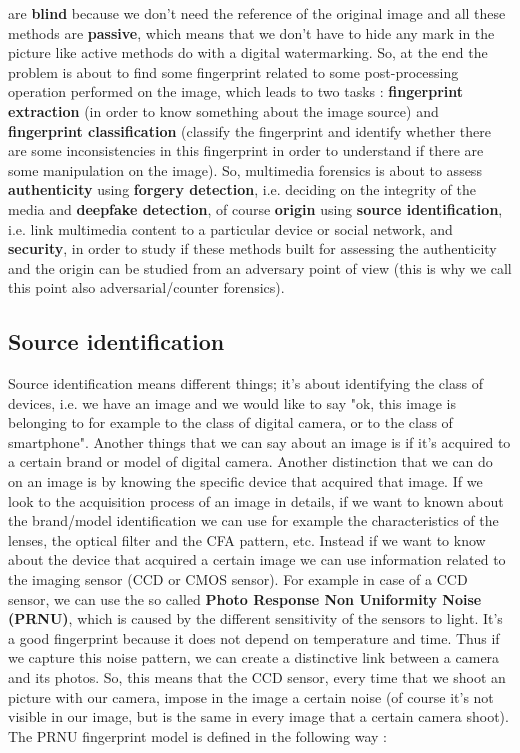 \documentclass[11pt]{article}
\begin{document}
are \textbf{blind} because we don't need the reference of the original image and all these methods are \textbf{passive}, which means that we don't have to hide any mark in the picture like active methods do with a digital watermarking. So, at the end the problem is about to find some fingerprint related to some post-processing operation performed on the image, which leads to two tasks : \textbf{fingerprint extraction} (in order to know something about the image source) and \textbf{fingerprint classification} (classify the fingerprint and identify whether there are some inconsistencies in this fingerprint in order to understand if there are some manipulation on the image). So, multimedia forensics is about to assess \textbf{authenticity} using \textbf{forgery detection}, i.e. deciding on the integrity of the media and \textbf{deepfake detection}, of course \textbf{origin} using \textbf{source identification}, i.e. link multimedia content to a particular device or social network,
and \textbf{security}, in order to study if these methods built for assessing the authenticity and the origin can be studied from an adversary point of view (this is why we call this point also adversarial/counter forensics). 

\subsection{Source identification}
Source identification means different things; it's about identifying the class of devices, i.e. we have an image and we would like to say "ok, this image is belonging to for example to the class of digital camera, or to the class of smartphone". Another things that we can say about an image is if it's acquired to a certain brand or model of digital camera. Another distinction that we can do on an image is by knowing the specific device that acquired that image. If we look to the acquisition process of an image in details, if we want to known about the brand/model identification we can use for example the characteristics of the lenses, the optical filter and the CFA pattern, etc. Instead if we want to know about the device that acquired a certain image we can use information related to the imaging sensor (CCD or CMOS sensor). For example in case of a CCD sensor, we can use the so called \textbf{Photo Response Non Uniformity Noise (PRNU)}, which is caused by the different sensitivity of the sensors to light. It's a good fingerprint because it does not depend on temperature and time. Thus if we capture this noise pattern, we can create a distinctive link between a camera and its photos. So, this means that the CCD sensor, every time that we shoot an picture with our camera, impose in the image a certain noise (of course it's not visible in our image, but is the same in every image that a certain camera shoot). The PRNU fingerprint model is defined in the following way :
\end{document}
